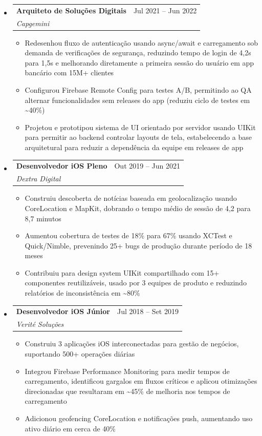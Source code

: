 \documentclass[11pt,letterpaper]{article}
\makeatletter
\newcommand{\resumeSubheading}[4]{
  \item
    \begin{tabular*}{\textwidth}{l@{\extracolsep{\fill}}r}
      \textbf{#1} & #2 \\
      \textit{#3} & \textit{#4} \\
    \end{tabular*}
}
\newcommand{\resumeItem}[1]{
  \item\small{#1}
}
\makeatother
\begin{document}
\begin{itemize}[leftmargin=0.15in]
    \resumeSubheading
        {Arquiteto de Soluções Digitais}{Jul 2021 -- Jun 2022}
        {Capgemini}{}
        \begin{itemize}
            \resumeItem{Redesenhou fluxo de autenticação usando async/await e carregamento sob demanda de verificações de segurança, reduzindo tempo de login de 4,2s para 1,5s e melhorando diretamente a primeira sessão do usuário em app bancário com 15M+ clientes}
            \resumeItem{Configurou Firebase Remote Config para testes A/B, permitindo ao QA alternar funcionalidades sem releases do app (reduziu ciclo de testes em \textasciitilde{}40\%)}
            \resumeItem{Projetou e prototipou sistema de UI orientado por servidor usando UIKit para permitir ao backend controlar layouts de tela, estabelecendo a base arquitetural para reduzir a dependência da equipe em releases de app}
        \end{itemize}

    \resumeSubheading
        {Desenvolvedor iOS Pleno}{Out 2019 -- Jun 2021}
        {Dextra Digital}{}
        \begin{itemize}
            \resumeItem{Construiu descoberta de notícias baseada em geolocalização usando CoreLocation e MapKit, dobrando o tempo médio de sessão de 4,2 para 8,7 minutos}
            \resumeItem{Aumentou cobertura de testes de 18\% para 67\% usando XCTest e Quick/Nimble, prevenindo 25+ bugs de produção durante período de 18 meses}
            \resumeItem{Contribuiu para design system UIKit compartilhado com 15+ componentes reutilizáveis, usado por 3 equipes de produto e reduzindo relatórios de inconsistência em \textasciitilde{}80\%}
        \end{itemize}

    \resumeSubheading
        {Desenvolvedor iOS Júnior}{Jul 2018 -- Set 2019}
        {Verité Soluções}{}
        \begin{itemize}
            \resumeItem{Construiu 3 aplicações iOS interconectadas para gestão de negócios, suportando 500+ operações diárias}
            \resumeItem{Integrou Firebase Performance Monitoring para medir tempos de carregamento, identificou gargalos em fluxos críticos e aplicou otimizações direcionadas que resultaram em \textasciitilde{}45\% de melhoria nos tempos de carregamento}
            \resumeItem{Adicionou geofencing CoreLocation e notificações push, aumentando uso ativo diário em cerca de 40\%}
        \end{itemize}
\end{itemize}
\end{document}
